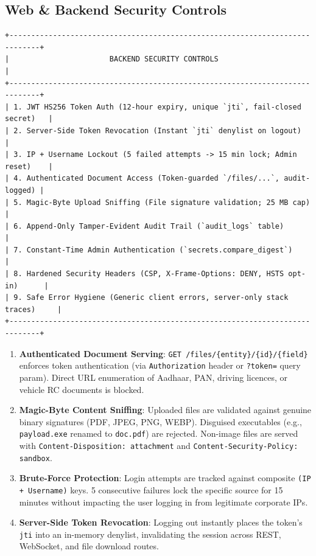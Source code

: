 \documentclass[11pt,a4paper]{article}
\begin{document}
\subsection{Web \& Backend Security Controls}
\begin{lstlisting}[style=asciiart]
+-----------------------------------------------------------------------------+
|                       BACKEND SECURITY CONTROLS                             |
+-----------------------------------------------------------------------------+
| 1. JWT HS256 Token Auth (12-hour expiry, unique `jti`, fail-closed secret)   |
| 2. Server-Side Token Revocation (Instant `jti` denylist on logout)          |
| 3. IP + Username Lockout (5 failed attempts -> 15 min lock; Admin reset)    |
| 4. Authenticated Document Access (Token-guarded `/files/...`, audit-logged) |
| 5. Magic-Byte Upload Sniffing (File signature validation; 25 MB cap)        |
| 6. Append-Only Tamper-Evident Audit Trail (`audit_logs` table)              |
| 7. Constant-Time Admin Authentication (`secrets.compare_digest`)            |
| 8. Hardened Security Headers (CSP, X-Frame-Options: DENY, HSTS opt-in)      |
| 9. Safe Error Hygiene (Generic client errors, server-only stack traces)     |
+-----------------------------------------------------------------------------+
\end{lstlisting}

\begin{enumerate}[leftmargin=1.4em,itemsep=3pt]
  \item \textbf{Authenticated Document Serving}: \texttt{GET /files/\{entity\}/\{id\}/\{field\}} enforces token authentication (via \texttt{Authorization} header or \texttt{?token=} query param). Direct URL enumeration of Aadhaar, PAN, driving licences, or vehicle RC documents is blocked.
  \item \textbf{Magic-Byte Content Sniffing}: Uploaded files are validated against genuine binary signatures (PDF, JPEG, PNG, WEBP). Disguised executables (e.g., \texttt{payload.exe} renamed to \texttt{doc.pdf}) are rejected. Non-image files are served with \texttt{Content-Disposition: attachment} and \texttt{Content-Security-Policy: sandbox}.
  \item \textbf{Brute-Force Protection}: Login attempts are tracked against composite \texttt{(IP + Username)} keys. 5 consecutive failures lock the specific source for 15 minutes without impacting the user logging in from legitimate corporate IPs.
  \item \textbf{Server-Side Token Revocation}: Logging out instantly places the token's \texttt{jti} into an in-memory denylist, invalidating the session across REST, WebSocket, and file download routes.
\end{enumerate}
\end{document}
